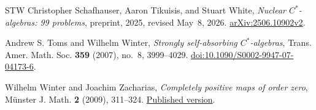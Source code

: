 \begin{thebibliography}{STW}
Christopher Schafhauser, Aaron Tikuisis, and Stuart White,
\emph{Nuclear $C^*$-algebras: 99 problems},
preprint, 2025, revised May~8, 2026.
\href{https://arxiv.org/abs/2506.10902v2}{arXiv:2506.10902v2}.

Andrew S. Toms and Wilhelm Winter,
\emph{Strongly self-absorbing $C^*$-algebras},
Trans. Amer. Math. Soc. \textbf{359} (2007), no.~8, 3999--4029.
\href{https://doi.org/10.1090/S0002-9947-07-04173-6}{doi:10.1090/S0002-9947-07-04173-6}.

Wilhelm Winter and Joachim Zacharias,
\emph{Completely positive maps of order zero},
M\"unster J. Math. \textbf{2} (2009), 311--324.
\href{https://www.uni-muenster.de/FB10/mjm/vol_2/mjm_vol_2_14.pdf}{Published version}.

\end{thebibliography}

